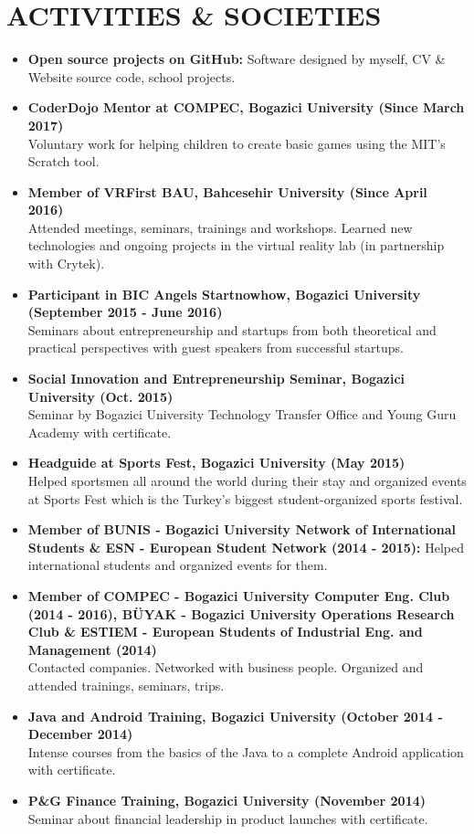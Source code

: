 \documentclass[a4paper, 10pt]{article}
\begin{document}
\section{ACTIVITIES \& SOCIETIES}
\begin{itemize}
    \item \textbf{Open source projects on GitHub:}
        Software designed by myself, CV \& Website source code, school projects.
    \item \textbf{CoderDojo Mentor at COMPEC, Bogazici University (Since March 2017)}\\
        Voluntary work for helping children to create basic games using the MIT's Scratch tool.
    \item \textbf{Member of VRFirst BAU, Bahcesehir University (Since April 2016)}\\
        Attended meetings, seminars, trainings and workshops. Learned new technologies and ongoing projects in the virtual reality lab (in partnership with Crytek).
    \item \textbf{Participant in BIC Angels Startnowhow, Bogazici University (September 2015 - June 2016)}\\
        Seminars about entrepreneurship and startups from both theoretical and practical perspectives with guest speakers from successful startups.
    \item \textbf{Social Innovation and Entrepreneurship Seminar, Bogazici University (Oct. 2015)}\\
        Seminar by Bogazici University Technology Transfer Office and Young Guru Academy with certificate.
    \item \textbf{Headguide at Sports Fest, Bogazici University (May 2015)}\\
        Helped sportsmen all around the world during their stay and organized events at Sports Fest which is the Turkey's biggest student-organized sports festival.
    \item \textbf{Member of BUNIS - Bogazici University Network of International Students \& ESN - European Student Network (2014 - 2015):}
        Helped international students and organized events for them.
    \item \textbf{Member of COMPEC - Bogazici University Computer Eng. Club (2014 - 2016), BÜYAK - Bogazici University Operations Research Club \& ESTIEM - European Students of Industrial Eng. and Management (2014)}\\
        Contacted companies. Networked with business people. Organized and attended trainings, seminars, trips.
    \item \textbf{Java and Android Training, Bogazici University (October 2014 - December 2014)}\\
        Intense courses from the basics of the Java to a complete Android application with certificate.
    \item \textbf{P\&G Finance Training, Bogazici University (November 2014)}\\
        Seminar about financial leadership in product launches with certificate.
\end{itemize}
\end{document}
